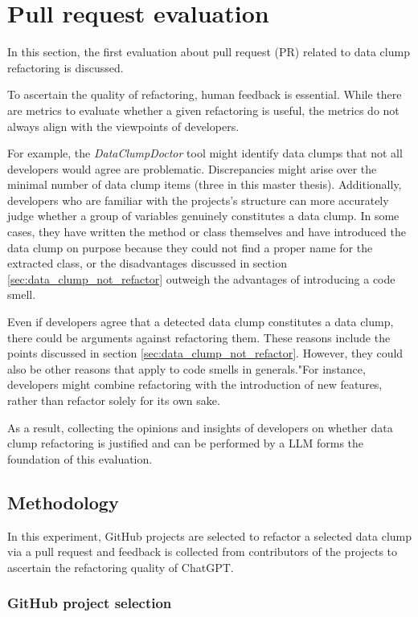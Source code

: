 
\section{Pull request evaluation}\label{sec:pull_request_eval}
In this section, the first evaluation about pull request (PR) related to data clump refactoring is discussed. 

To ascertain the quality of refactoring, human feedback is essential. While there are metrics to evaluate whether a given refactoring is useful, the metrics do not always align with the viewpoints of developers. 

 For example, the \textit{DataClumpDoctor} tool might identify data clumps that not all developers would agree are problematic. Discrepancies might arise over the minimal number of data clump items (three in this master thesis). Additionally, developers who are  familiar with the projects's structure can more accurately judge  whether a group of variables  genuinely constitutes a data clump. In some cases, they have written the method or class themselves and have introduced the data clump on purpose because they could not find a proper name for the extracted class, or the disadvantages discussed in section \ref{sec:data_clump_not_refactor} outweigh the advantages of introducing a code smell. 

Even if developers agree that a detected data clump constitutes a data clump, there could be arguments against refactoring them. These reasons include the points  discussed in section \ref{sec:data_clump_not_refactor}. However, they could also be other reasons that apply to code smells in generals."For instance, developers might combine refactoring with the introduction of new features, rather than refactor solely for its own sake. 

As a result, collecting  the opinions and insights of developers on whether data clump refactoring is justified and can be performed by a \ac{LLM}  forms the foundation of this evaluation.

\subsection{Methodology}
In this experiment, GitHub projects are selected to refactor a selected data clump via a pull request and feedback is collected from contributors of the projects to ascertain the refactoring quality of ChatGPT. 

\subsubsection{GitHub project selection}\label{sec:github_projects}

